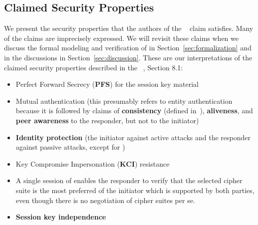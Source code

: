 \subsection{Claimed Security Properties}
\label{sec:claimedProperties}
\fillhack
We present the security properties that the authors
of the \mSpec{}~\cite{selander-lake-edhoc-01} claim \mEdhoc{} satisfies.
%
Many of the claims are imprecisely expressed.
%
We will revisit these claims when we discuss the formal modeling and
verification of \mEdhoc{} in Section~\ref{sec:formalization} and in the
discussions in Section~\ref{sec:discussion}.
%
These are our interpretations of the claimed security properties described in
the \mSpec~\cite{selander-lake-edhoc-01}, Section 8.1:
\begin{itemize}
    \item Perfect Forward Secrecy (\textbf{PFS}) for the session key material
    \item Mutual authentication (this presumably refers to entity authentication
        because it is followed by claims of
        \textbf{consistency} (defined in~\cite{sigma}),
        \textbf{aliveness}, and
        \textbf{peer awareness} to the responder, but not to the initiator)
    \item \textbf{Identity protection} (the initiator against active attacks
        and the responder against passive attacks, except for \mPskPsk{})
    \item Key Compromise Impersonation (\textbf{KCI}) resistance
    \item A single session of \mEdhoc{} enables the responder to verify
            that the selected cipher suite is the most preferred of the
            initiator which is supported by both parties, even though there is
            no negotiation of cipher suites per se.
    \item \textbf{Session key independence}
\end{itemize}

